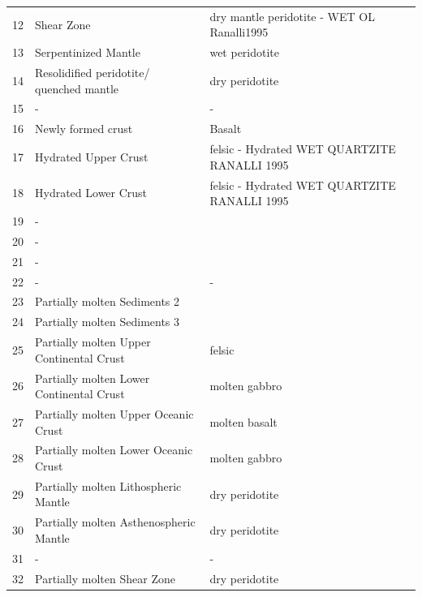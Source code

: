 \begin{table}[H]
\begin{tabular}{l p{6cm} p{8cm}}
\rowcolor[rgb]{0    0.5020    1.0000}
12 & Shear Zone & dry mantle peridotite - WET OL Ranalli1995 \\
\rowcolor[rgb]{0         0    0.4902}
13 & Serpentinized Mantle & wet peridotite \\
\rowcolor[rgb]{ 0.7000    0.1200    0.3000}
14 & Resolidified peridotite/ quenched mantle & dry peridotite \\
\rowcolor[rgb]{1.0000    1.0000    1.0000}
15 & - & - \\
\rowcolor[rgb]{0.3137    0.8941    0.2470}
16 & Newly formed crust & Basalt \\
\rowcolor[rgb]{0.5412    0.7216    0.9922}
17 & Hydrated Upper Crust & felsic - Hydrated WET QUARTZITE RANALLI 1995 \\
\rowcolor[rgb]{0.5412    0.7216    0.9922}
18 & Hydrated Lower Crust & felsic - Hydrated WET QUARTZITE RANALLI 1995 \\
\rowcolor[rgb]{1.0000    1.0000    1.0000}
19 & - & \\
\midrule
\rowcolor[rgb]{1.0000    1.0000    1.0000}
20 & - & \\
\rowcolor[rgb]{1.0000    1.0000    1.0000}
21 & - & \\
\rowcolor[rgb]{1.0000    1.0000    1.0000}
22 & - & - \\
\rowcolor[rgb]{1.0000    1.0000    0.3176}
23 & Partially molten Sediments 2 & \\
\rowcolor[rgb]{1.0000    0.9020    0.1882}
24 & Partially molten Sediments 3 & \\
\rowcolor[rgb]{0.4667    0.4667    0.2353}
25 & Partially molten Upper Continental Crust & felsic \\
\rowcolor[rgb]{0.5020    0.5020         0}
26 & Partially molten Lower Continental Crust & molten gabbro \\
\rowcolor[rgb]{0.7255    0.0157    0.7843}
27 & Partially molten Upper Oceanic Crust & molten basalt \\
\rowcolor[rgb]{0.9255    0.4392    0.9961}
28 & Partially molten Lower Oceanic Crust & molten gabbro \\
\rowcolor[rgb]{1.0000         0         0}
29 & Partially molten Lithospheric Mantle & dry peridotite \\
\rowcolor[rgb]{1.0000         0         0}
30 & Partially molten Asthenospheric Mantle & dry peridotite \\
\rowcolor[rgb]{1.0000    1.0000    1.0000}
31 & - & -\\
\rowcolor[rgb]{0.8471    0.0784    0.1529}
32 & Partially molten Shear Zone & dry peridotite \\

\end{tabular}
\end{table}
